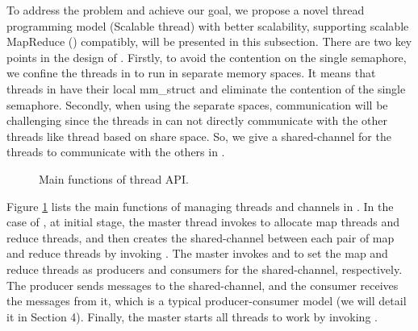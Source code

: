 To address the problem and achieve our goal, we propose a novel thread programming model \myth (Scalable thread) with better scalability, supporting scalable MapReduce (\myds) compatibly, will be presented in this subsection.
There are two key points in the design of \myth.
Firstly, to avoid the contention on the single semaphore, we confine the threads in \myth to run in separate memory spaces. 
It means that threads in \myth have their local mm\_struct and eliminate the contention of the single semaphore.
Secondly, when using the separate spaces, communication will be challenging since
the threads in \myth can not directly communicate with the other threads like thread based on share space.
So, we give a shared-channel for the threads to communicate with the others in \myth. 




\label{sec:pm:thread}
\begin{figure}[htpb]

\caption{Main functions of \myds thread API.}
\label{fig:api:thread}
\end{figure}

Figure \ref{fig:api:thread} lists the main functions of managing threads and channels in \myth.
In the case of \myds, at initial stage, the master thread invokes  to allocate map threads and reduce threads, and then creates the shared-channel  between each pair of map  and reduce threads by invoking .
The master invokes  and  to set the map and reduce threads as producers and consumers for the shared-channel, respectively.
The producer sends messages to the shared-channel, and the consumer receives the messages from it,
which is a typical producer-consumer model (we will detail it in Section 4). 
Finally, the master starts all threads to work by invoking .

